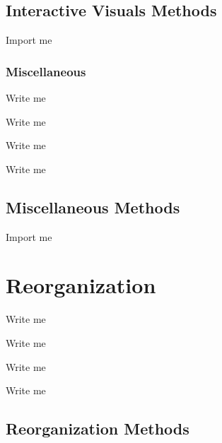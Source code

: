 \documentclass[letterpaper,10pt,english]{sphinxmanual}
\begin{document}
\subsection{Interactive Visuals Methods}
\label{\detokenize{Sub-Packages:interactive-visuals-methods}}
\begin{DUlineblock}{0em}
\item[] Import me
\end{DUlineblock}


\subsubsection{Miscellaneous}
\label{\detokenize{Sub-Packages:miscellaneous}}\label{\detokenize{Sub-Packages:miscellaneous-module}}
\begin{DUlineblock}{0em}
\item[] Write me
\item[] Write me
\item[] Write me
\item[] Write me
\end{DUlineblock}


\subsection{Miscellaneous Methods}
\label{\detokenize{Sub-Packages:miscellaneous-methods}}
\begin{DUlineblock}{0em}
\item[] Import me
\end{DUlineblock}


\section{Reorganization}
\label{\detokenize{Sub-Packages:reorganization}}\label{\detokenize{Sub-Packages:reorganization-module}}
\begin{DUlineblock}{0em}
\item[] Write me
\item[] Write me
\item[] Write me
\item[] Write me
\end{DUlineblock}


\subsection{Reorganization Methods}
\label{\detokenize{Sub-Packages:reorganization-methods}}
\sphinxstepscope
\end{document}
